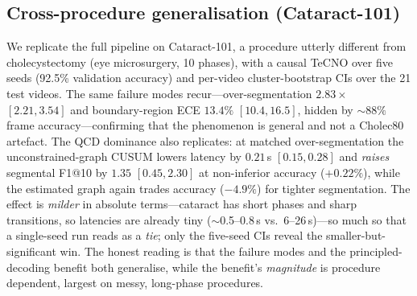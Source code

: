 \documentclass[11pt]{article}
\begin{document}
\subsection{Cross-procedure generalisation (Cataract-101)}
\label{sec:cross}
We replicate the full pipeline on Cataract-101, a procedure utterly different from
cholecystectomy (eye microsurgery, 10 phases), with a causal TeCNO over five seeds
(92.5\% validation accuracy) and per-video cluster-bootstrap CIs over the 21 test videos.
The same failure modes recur---over-segmentation $2.83\times$ $[2.21,3.54]$ and
boundary-region ECE $13.4\%$ $[10.4,16.5]$, hidden by ${\sim}88\%$ frame
accuracy---confirming that the phenomenon is general and not a Cholec80 artefact. The QCD
dominance also replicates: at matched over-segmentation the unconstrained-graph CUSUM
lowers latency by $0.21$\,s $[0.15,0.28]$ and \emph{raises} segmental F1@10 by
$1.35$ $[0.45,2.30]$ at non-inferior accuracy ($+0.22\%$), while the estimated graph again
trades accuracy ($-4.9\%$) for tighter segmentation. The effect is \emph{milder} in
absolute terms---cataract has short phases and sharp transitions, so latencies are already
tiny ($\sim$0.5--0.8\,s vs.\ 6--26\,s)---so much so that a single-seed run reads as a
\emph{tie}; only the five-seed CIs reveal the smaller-but-significant win. The honest
reading is that the failure modes and the principled-decoding benefit both generalise,
while the benefit's \emph{magnitude} is procedure dependent, largest on messy, long-phase
procedures.
\end{document}
